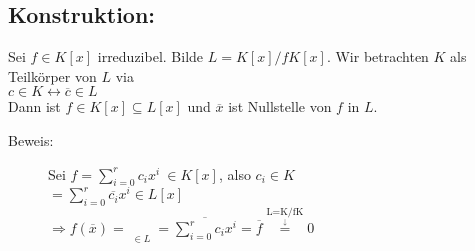 \subsection{Konstruktion:}
Sei $f \in K[x]$ irreduzibel. Bilde $L=K[x]/fK[x]$. Wir betrachten $K$ als Teilkörper von $L$ via\\
$c \in K \longleftrightarrow \overline{c} \in L$ \\
Dann ist $f \in K[x] \subseteq L[x]$ und $\overline{x}$ ist Nullstelle von $f$ in $L$. \\
\begin{description}
	\item[Beweis:] Sei $f = \sum\limits^{r}_{i=0}c_{i}x^{i} \ \in K[x]$, also $c_{i} \in K$\\
				$= \sum\limits^{r}_{i=0}\overline{c_{i}}x^{i} \in L[x]$\\
				$\Rightarrow f(\overline{x}) = \mathop{\underbrace{\sum\limits^{r}_{i=0} c_{i}x^{i}}}\limits_{ \in 
				L} = \overline{\sum\limits^{r}_{i=0} c_{i} x^{i}} = \overline{f} \mathop{=} \limits^{\mathop{
				L=K[x]/fK[x]}\limits_{\downarrow}} 0$
\end{description}